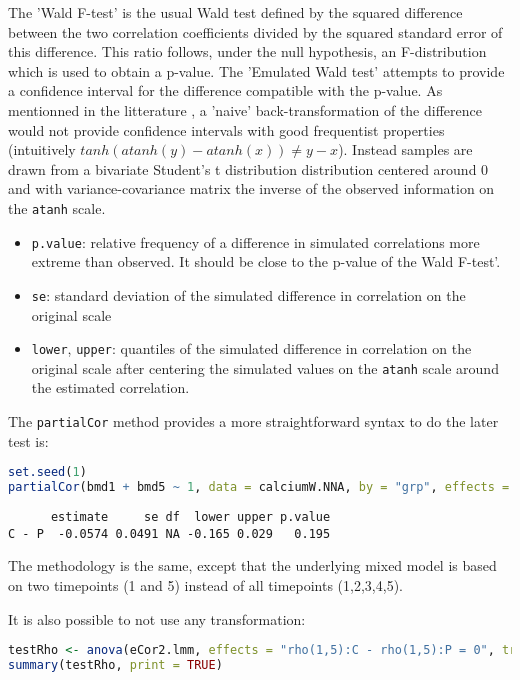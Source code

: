 \documentclass[12pt]{article}
\begin{document}
The 'Wald F-test' is the usual Wald test defined by the squared
difference between the two correlation coefficients divided by the
squared standard error of this difference. This ratio follows, under
the null hypothesis, an F-distribution which is used to obtain a
p-value. The 'Emulated Wald test' attempts to provide a confidence
interval for the difference compatible with the p-value. As mentionned
in the litterature \citep{zou2007toward}, a 'naive' back-transformation
of the difference would not provide confidence intervals with good
frequentist properties (intuitively \(tanh(atanh(y)-atanh(x))\neq y -
x\)). Instead samples are drawn from a bivariate Student's t
distribution distribution centered around 0 and with
variance-covariance matrix the inverse of the observed information on
the \texttt{atanh} scale.
\begin{itemize}
\item \texttt{p.value}: relative frequency of a difference in simulated
correlations more extreme than observed. It should be close to the
p-value of the Wald F-test'.
\item \texttt{se}: standard deviation of the simulated difference in correlation
on the original scale
\item \texttt{lower}, \texttt{upper}: quantiles of the simulated difference in
correlation on the original scale after centering the simulated
values on the \texttt{atanh} scale around the estimated correlation.
\end{itemize}

\clearpage

The \texttt{partialCor} method provides a more straightforward syntax to do
the later test is:

\begin{lstlisting}[language=r,numbers=none]
set.seed(1)
partialCor(bmd1 + bmd5 ~ 1, data = calciumW.NNA, by = "grp", effects = "Dunnett") 
\end{lstlisting}

\label{}
\begin{verbatim}
      estimate     se df  lower upper p.value
C - P  -0.0574 0.0491 NA -0.165 0.029   0.195
\end{verbatim}


The methodology is the same, except that the underlying mixed model is
based on two timepoints (1 and 5) instead of all timepoints
(1,2,3,4,5).
\bigskip

It is also possible to not use any transformation: 
\begin{lstlisting}[language=r,numbers=none]
testRho <- anova(eCor2.lmm, effects = "rho(1,5):C - rho(1,5):P = 0", transform.rho = "none")
summary(testRho, print = TRUE)
\end{lstlisting}
\end{document}
